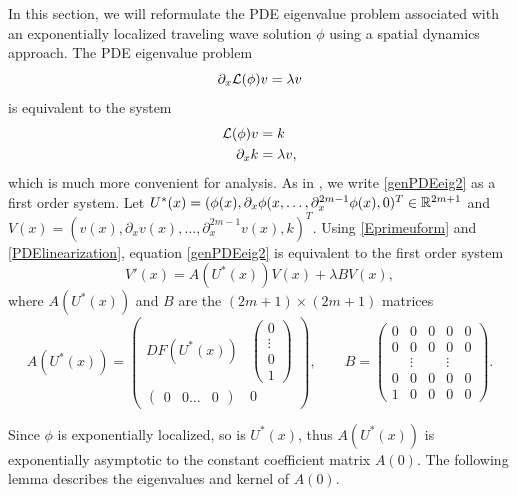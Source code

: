 \documentclass[11pt,reqno]{amsart}
\theoremstyle{plain}
\theoremstyle{definition}
\theoremstyle{remark}
\begin{document}
In this section, we will reformulate the PDE eigenvalue problem associated with an exponentially localized traveling wave solution $\phi$ using a spatial dynamics approach.  The PDE eigenvalue problem
\begin{equation}\label{genPDEeig}
\partial_x \mathcal{L}(\phi) v = \lambda v
\end{equation}
is equivalent to the system
\begin{equation}\label{genPDEeig2}
\begin{aligned}
\mathcal{L}(\phi) v &= k \\
\partial_x k &= \lambda v,
\end{aligned}
\end{equation}
which is much more convenient for analysis. As in \cite{Sandstede1998}, we write \cref{genPDEeig2} as a first order system. Let $U^*(x) = (\phi(x), \partial_x \phi(x, \dots, \partial_x^{2m-1}\phi(x), 0)^T \in \mathbb{R}^{2m+1}$ and $V(x) = (v(x), \partial_x v(x), \dots, \partial_x^{2m-1} v(x), k)^T$. Using \cref{Eprimeuform} and \cref{PDElinearization}, equation \cref{genPDEeig2} is equivalent to the first order system
\begin{equation}\label{PDEeigsystem}
V'(x) = A(U^*(x))V(x) + \lambda B V(x),
\end{equation}
where $A(U^*(x))$ and $B$ are the $(2m+1) \times (2m+1)$ matrices
\begin{equation}\label{defAB}
A(U^*(x)) = 
\begin{pmatrix}
DF(U^*(x)) & \begin{pmatrix} 0 \\ \vdots \\ 0 \\ 1 \end{pmatrix} \\
\begin{pmatrix} 0 & 0 \dots & 0 \end{pmatrix} & 0
\end{pmatrix}, \qquad
B = \begin{pmatrix}0 & 0 & 0 & 0 & 0 \\0 & 0 & 0 & 0 & 0 \\  & 
\vdots & & \vdots & \\0 & 0 & 0 & 0 & 0 \\1 & 0 & 0 & 0 & 0 \end{pmatrix}.
\end{equation}

Since $\phi$ is exponentially localized, so is $U^*(x)$, thus $A(U^*(x))$ is exponentially asymptotic to the constant coefficient matrix $A(0)$. The following lemma describes the eigenvalues and kernel of $A(0)$.
\end{document}
